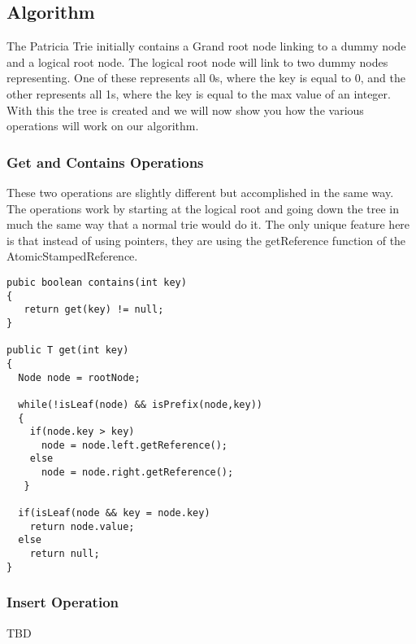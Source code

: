 \documentclass[conference]{IEEEtran}
\begin{document}
\subsection{Algorithm}
The Patricia Trie initially contains a Grand root node linking to a dummy node and a logical root node. The logical root node will link to two dummy nodes representing. One of these represents all 0s, where the key is equal to 0, and the other represents all 1s, where the key is equal to the max value of an integer. With this the tree is created and we will now show you how the various operations will work on our algorithm.

\subsubsection{Get and Contains Operations}
These two operations are slightly different but accomplished in the same way. The operations work by starting at the logical root and going down the tree in much the same way that a normal trie would do it. The only unique feature here is that instead of using pointers, they are using the getReference function of the AtomicStampedReference.
\begin{lstlisting}[frame=lines]
pubic boolean contains(int key)
{
   return get(key) != null;
}

public T get(int key)
{
  Node node = rootNode;

  while(!isLeaf(node) && isPrefix(node,key))
  {
    if(node.key > key)
      node = node.left.getReference();
    else
      node = node.right.getReference();
   }

  if(isLeaf(node && key = node.key)
    return node.value;
  else
    return null;
}
\end{lstlisting}

\subsubsection{Insert Operation}
TBD
\end{document}
